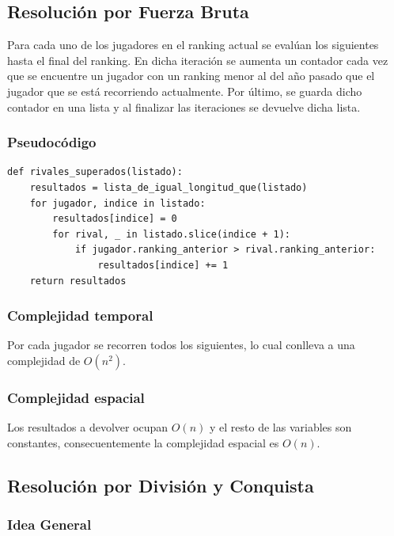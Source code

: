 \documentclass[titlepage,a4paper]{article}
\begin{document}
\subsection{Resolución por Fuerza Bruta}
\label{sec:org01eef98}

Para cada uno de los jugadores en el ranking actual se evalúan los siguientes hasta el final del ranking. En dicha iteración se aumenta un contador cada vez que se encuentre un jugador con un ranking menor al del año pasado que el jugador que se está recorriendo actualmente. Por último, se guarda dicho contador en una lista y al finalizar las iteraciones se devuelve dicha lista.

\subsubsection{Pseudocódigo}
\label{sec:org748d9d7}

\begin{verbatim}
def rivales_superados(listado):
    resultados = lista_de_igual_longitud_que(listado)
    for jugador, indice in listado:
        resultados[indice] = 0
        for rival, _ in listado.slice(indice + 1):
            if jugador.ranking_anterior > rival.ranking_anterior:
                resultados[indice] += 1
    return resultados
\end{verbatim}

\subsubsection{Complejidad temporal}
\label{sec:org2d096d2}

Por cada jugador se recorren todos los siguientes, lo cual conlleva a una complejidad de \(O(n^2)\).

\subsubsection{Complejidad espacial}
\label{sec:orge03096b}

Los resultados a devolver ocupan \(O(n)\) y el resto de las variables son constantes, consecuentemente la complejidad espacial es \(O(n)\).

\subsection{Resolución por División y Conquista}
\label{sec:org1688c42}

\subsubsection{Idea General}
\label{sec:orgc7f1cb5}
\end{document}
